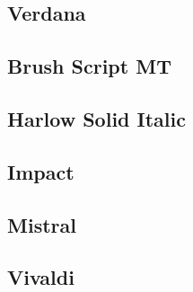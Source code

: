 \documentclass[12pt]{article}
\begin{document}
\subsection*{Verdana}
\lipsum[1]

\subsection*{Brush Script MT}
\lipsum[1]

\subsection*{Harlow Solid Italic}
\lipsum[1]

\subsection*{Impact}
\lipsum[1]

\subsection*{Mistral}
\lipsum[1]


\subsection*{Vivaldi}
\lipsum[1]
\end{document}

